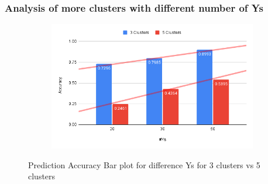 \documentclass{article}
\begin{document}
\clearpage

\subsubsection{Analysis of more clusters with different number of Ys}

\begin{figure}[htbp!]
  \centering
  \begin{subfigure}{0.8\textwidth}
      \centering
      \includegraphics[width=\textwidth]{images/experiments/3_vs_5_clusters}
  \end{subfigure}
  \caption{Prediction Accuracy Bar plot for difference Ys for 3 clusters vs 5 clusters}
  \label{fig:3vs5}
\end{figure}
\end{document}
